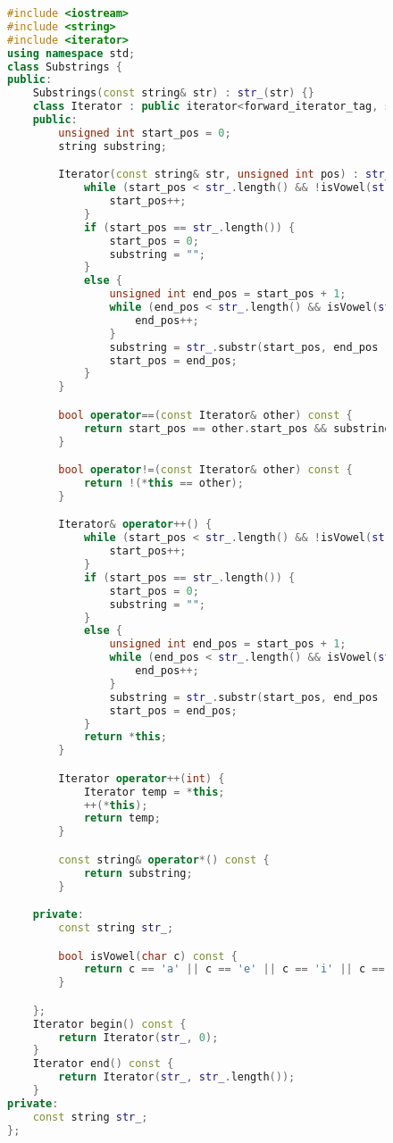 \documentclass[a4paper, 14pt]{extarticle}
\begin{document}
\begin{figure}[!htb]
\begin{lstlisting}[language={c++},caption={Substrings.h},label={lst:code2}]
#include <iostream>
#include <string>
#include <iterator>
using namespace std;
class Substrings {
public:
    Substrings(const string& str) : str_(str) {}
    class Iterator : public iterator<forward_iterator_tag, string> {
    public:
        unsigned int start_pos = 0;
        string substring;

        Iterator(const string& str, unsigned int pos) : str_(str), start_pos(pos) {
            while (start_pos < str_.length() && !isVowel(str_[start_pos])) {
                start_pos++;
            }
            if (start_pos == str_.length()) {
                start_pos = 0;
                substring = "";
            }
            else {
                unsigned int end_pos = start_pos + 1;
                while (end_pos < str_.length() && isVowel(str_[end_pos])) {
                    end_pos++;
                }
                substring = str_.substr(start_pos, end_pos - start_pos);
                start_pos = end_pos;
            }
        }

        bool operator==(const Iterator& other) const {
            return start_pos == other.start_pos && substring == other.substring;
        }

        bool operator!=(const Iterator& other) const {
            return !(*this == other);
        }

        Iterator& operator++() {
            while (start_pos < str_.length() && !isVowel(str_[start_pos])) {
                start_pos++;
            }
            if (start_pos == str_.length()) {
                start_pos = 0;
                substring = "";
            }
            else {
                unsigned int end_pos = start_pos + 1;
                while (end_pos < str_.length() && isVowel(str_[end_pos])) {
                    end_pos++;
                }
                substring = str_.substr(start_pos, end_pos - start_pos);
                start_pos = end_pos;
            }
            return *this;
        }

        Iterator operator++(int) {
            Iterator temp = *this;
            ++(*this);
            return temp;
        }

        const string& operator*() const {
            return substring;
        }

    private:
        const string str_;

        bool isVowel(char c) const {
            return c == 'a' || c == 'e' || c == 'i' || c == 'o' || c == 'u' || c == 'A' || c == 'E' || c == 'I' || c == 'O' || c == 'U';
        }

    };
    Iterator begin() const {
        return Iterator(str_, 0);
    }
    Iterator end() const {
        return Iterator(str_, str_.length());
    }
private:
    const string str_;
};
\end{lstlisting}
\end{figure}
\end{document}
